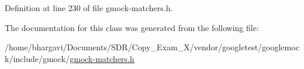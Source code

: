 Definition at line 230 of file gmock-\/matchers.\+h.



The documentation for this class was generated from the following file\+:\begin{DoxyCompactItemize}
\item 
/home/bhargavi/\+Documents/\+S\+D\+R/\+Copy\+\_\+\+Exam\+\_\+X/vendor/googletest/googlemock/include/gmock/\hyperlink{gmock-matchers_8h}{gmock-\/matchers.\+h}\end{DoxyCompactItemize}
